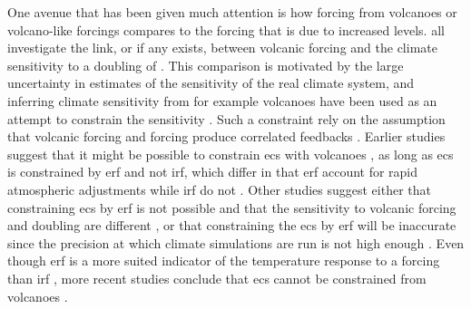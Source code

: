 \documentclass{ametsocV6.1}
\begin{document}



One avenue that has been given much attention is how forcing from volcanoes or
volcano-like forcings compares to the forcing that is due to increased  levels.
\citet{boer2007,marvel2016,merlis2014,ollila2016,richardson2019,salvi2022,wigley2005}
all investigate the link, or if any exists, between volcanic forcing and the climate
sensitivity to a doubling of . This comparison is motivated by the large
uncertainty in estimates of the sensitivity of the real climate system, and inferring
climate sensitivity from for example volcanoes have been used as an attempt to constrain
the sensitivity \citep{boer2007}. Such a constraint rely on the assumption that volcanic
forcing and  forcing produce correlated feedbacks \citep{pauling2023}. Earlier
studies suggest that it might be possible to constrain \gls{ecs} with volcanoes
\citep{bender2010}, as long as \gls{ecs} is constrained by \gls{erf} and not \gls{irf},
which differ in that \gls{erf} account for rapid atmospheric adjustments while \gls{irf}
do not \citep{richardson2019}. Other studies suggest either that constraining \gls{ecs}
by \gls{erf} is not possible and that the sensitivity to volcanic forcing and 
doubling are different \citep{douglass2006}, or that constraining the \gls{ecs} by
\gls{erf} will be inaccurate since the precision at which climate simulations are run is
not high enough \citep{boer2007,salvi2022}. Even though \gls{erf} is a more suited
indicator of the temperature response to a forcing than \gls{irf}
\citep{marvel2016,richardson2019}, more recent studies conclude that \gls{ecs} cannot be
constrained from volcanoes \citep{pauling2023}.

\end{document}
